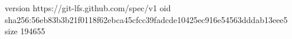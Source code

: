 version https://git-lfs.github.com/spec/v1
oid sha256:56eb83b3b21f0118f62ebca45cfcc39fadcde10425ec916e54563dddab13eee5
size 194655
